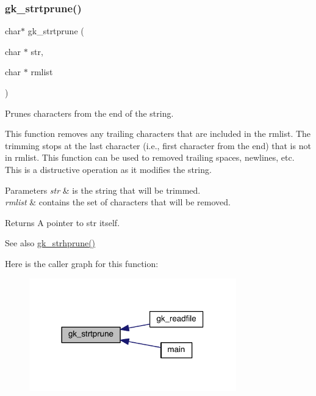 \subsubsection{\texorpdfstring{gk\+\_\+strtprune()}{gk\_strtprune()}}
{\footnotesize\ttfamily char$\ast$ gk\+\_\+strtprune (\begin{DoxyParamCaption}\item[{char $\ast$}]{str,  }\item[{char $\ast$}]{rmlist }\end{DoxyParamCaption})}



Prunes characters from the end of the string. 

This function removes any trailing characters that are included in the {\ttfamily rmlist}. The trimming stops at the last character (i.\+e., first character from the end) that is not in {\ttfamily rmlist}. This function can be used to removed trailing spaces, newlines, etc. This is a distructive operation as it modifies the string.


\begin{DoxyParams}{Parameters}
{\em str} & is the string that will be trimmed. \\
\hline
{\em rmlist} & contains the set of characters that will be removed. \\
\hline
\end{DoxyParams}
\begin{DoxyReturn}{Returns}
A pointer to {\ttfamily str} itself. 
\end{DoxyReturn}
\begin{DoxySeeAlso}{See also}
\hyperlink{a00143_adf6c1dfa83b68cea7f048086e0a585c0}{gk\+\_\+strhprune()} 
\end{DoxySeeAlso}
Here is the caller graph for this function\+:\nopagebreak
\begin{figure}[H]
\begin{center}
\leavevmode
\includegraphics[width=254pt]{a00077_a3090611e4e08f52edd87b455dcb420c8_icgraph}
\end{center}
\end{figure}
\mbox{\label{a00077_a6eb7d344c153ba6c0bbe608c18a4a2a1}} 
